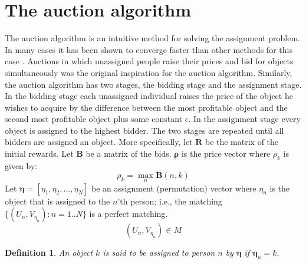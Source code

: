 \documentclass[11pt,onecolumn]{article}
\newcounter{theorem}
\newcounter{definition}
\newtheorem{definition}{Definition}
\newcommand{\beq}{\begin{equation}}
\newcommand{\eeq}{\end{equation}}
\begin{document}
\section{The auction algorithm}
\label{section_auction_alg}
The auction algorithm \cite{bertsekas1979distributed} is an intuitive method for solving the assignment problem. In many cases it has been shown to converge faster than other methods for this case \cite{bertsekas1990auction}. Auctions in which unassigned people raise their prices and bid for objects simultaneously was the original inspiration for the auction algorithm. Similarly, the auction algorithm has two stages, the bidding stage and the assignment stage. In the bidding stage each unassigned individual raises the price of the object he wishes to acquire by the difference between the most profitable object and the second most profitable object plus some constant $\epsilon$. In the assignment stage every object is assigned to the highest bidder. The two stages are repeated until all bidders are assigned an object. More specifically, let $\textbf{R}$ be the matrix of the initial rewards. Let $\textbf{B}$ be a matrix of the bids. $\boldsymbol\rho$ is the price vector where $\rho_k$ is given by:
\beq\label{eq_rho}
\rho_k=\max_{n}\textbf{B}(n,k)
\eeq
Let $\boldsymbol\eta=\left[\eta_1,\eta_2,...,\eta_N\right]$ be an assignment (permutation) vector  where $\eta_n$ is the object that is assigned to the $n$'th person; i.e., the matching $\{(U_n, V_{\eta_n}):n=1..N\}$ is a perfect matching.
\beq
(U_n,V_{\eta_n})\in M
\eeq
\begin{definition} An object $k$ is said to be \emph{assigned} to person $n$ by $\boldsymbol\eta$ if $\boldsymbol\eta_n=k$.
\end{definition}
\end{document}
